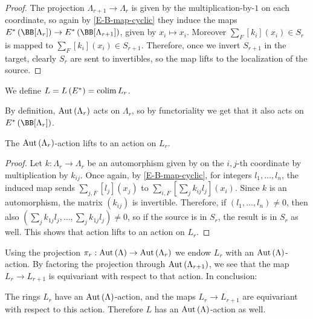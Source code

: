 \begin{proof}
	The projection $\Lambda_{r+1} \to \Lambda_r$ is given by the multiplication-by-$1$ on each coordinate, so again by \cref{E-B-map-cyclic} they induce the maps $E^*\left(\BB[\Lambda_r]\right) \to E^*\left(\BB[\Lambda_{r+1}]\right)$, given by $x_i \mapsto x_i$.
	Moreover $\sum_F [k_i]\left(x_i\right) \in S_r$ is mapped to $\sum_F [k_i]\left(x_i\right) \in S_{r+1}$.
	Therefore, once we invert $S_{r+1}$ in the target, clearly $S_r$ are sent to invertibles, so the map lifts to the localization of the source.
\end{proof}

\begin{definition}
	We define $L = L\left(E^*\right) = \operatorname{colim} L_r$.
\end{definition}

By definition, $\operatorname{Aut}\left(\Lambda_r\right)$ acts on $\Lambda_r$, so by functoriality we get that it also acts on $E^*\left(\BB[\Lambda_r]\right)$.

\begin{proposition}
	The $\operatorname{Aut}\left(\Lambda_r\right)$-action lifts to an action on $L_r$.
\end{proposition}

\begin{proof}
	Let $k: \Lambda_r \to \Lambda_r$ be an automorphism given by on the $i,j$-th coordinate by multiplication by $k_{ij}$.
	Once again, by \cref{E-B-map-cyclic}, for integers $l_1, \dotsc, l_n$, the induced map sends $\sum_{j,F} [l_j]\left(x_j\right)$ to $\sum_{i,F}\left[\sum_j k_{ij} l_j\right]\left(x_i\right)$.
	Since $k$ is an automorphism, the matrix $\left(k_{ij}\right)$ is invertible.
	Therefore, if $\left(l_1, \dotsc, l_n\right) \neq 0$, then also $\left(\sum_j k_{1j} l_j, \dotsc, \sum_j k_{1j} l_j\right) \neq 0$, so if the source is in $S_r$, the result is in $S_r$ as well.
	This shows that action lifts to an action on $L_r$.
\end{proof}

Using the projection $\pi_r: \operatorname{Aut}\left(\Lambda\right) \to \operatorname{Aut}\left(\Lambda_r\right)$ we endow $L_r$ with an $\operatorname{Aut}\left(\Lambda\right)$-action.
By factoring the projection through $\operatorname{Aut}\left(\Lambda_{r+1}\right)$, we see that the map $L_r \to L_{r+1}$ is equivariant with respect to that action.
In conclusion:

\begin{proposition}
	The rings $L_r$ have an $\operatorname{Aut}\left(\Lambda\right)$-action, and the maps $L_r \to L_{r+1}$ are equivariant with respect to this action.
	Therefore $L$ has an $\operatorname{Aut}\left(\Lambda\right)$-action as well.
\end{proposition}

